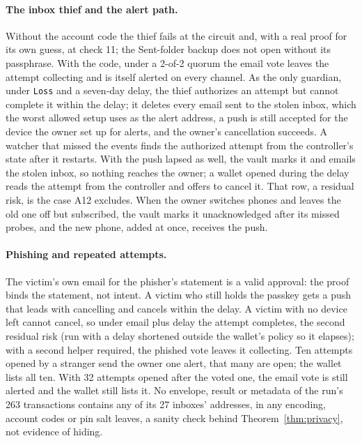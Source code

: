 \paragraph{The inbox thief and the alert path.} Without the account code the
thief fails at the circuit and, with a real proof for its own guess, at
check 11; the Sent-folder backup does not open without its passphrase. With
the code, under a 2-of-2 quorum the email vote leaves the attempt collecting
and is itself alerted on every channel. As the only guardian, under
\texttt{Loss} and a seven-day delay, the thief authorizes an attempt but
cannot complete it within the delay; it deletes every email sent to the
stolen inbox, which the worst allowed setup uses as the alert address, a
push is still accepted for the device the owner set up for alerts, and the
owner's cancellation succeeds. A watcher that missed the events finds the authorized attempt from
the controller's state after it restarts.
With the push lapsed as well, the vault marks it and emails the stolen
inbox, so nothing reaches the owner; a wallet opened during the delay reads
the attempt from the controller and offers to cancel it. That row, a residual
risk, is the case A12 excludes. When the owner switches phones and leaves
the old one off but subscribed, the vault marks it unacknowledged after its
missed probes, and the new phone, added at once, receives the
push.

\paragraph{Phishing and repeated attempts.} The victim's own email for the
phisher's statement is a valid approval: the proof binds the statement, not
intent. A victim who still holds the passkey gets a push that leads with
cancelling and cancels within the delay. A victim with no device left cannot
cancel, so under email plus delay the attempt completes, the second residual
risk (run with a delay shortened outside the wallet's policy so it elapses);
with a second helper required, the phished vote leaves it collecting. Ten
attempts opened by a stranger send the owner one alert, that many are open;
the wallet lists all ten. With 32 attempts opened after the voted one, the
email vote is still alerted and the wallet still lists it. No envelope,
result or metadata of the run's 263
transactions contains any of its 27 inboxes' addresses, in any encoding,
account codes or pin salt leaves, a sanity check behind
Theorem~\ref{thm:privacy}, not evidence of hiding.

